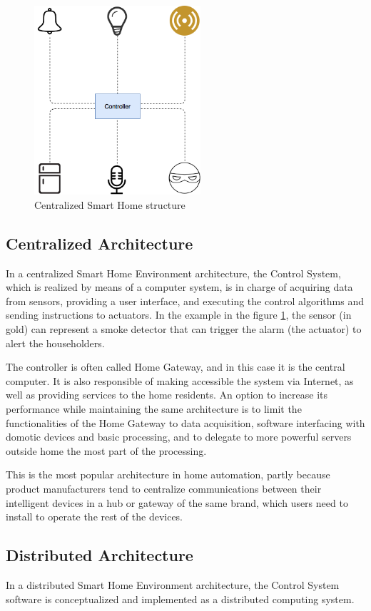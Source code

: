 \begin{figure}
	\centering
	\includegraphics[width=0.55\textwidth]{images/Chapter_02/basic-sh-structure.png}
	\caption{Centralized Smart Home structure}
	\label{fig:sh-basic-structure}
\end{figure}

\subsection{Centralized Architecture}
In a centralized Smart Home Environment architecture, the Control System, which is realized by means of a computer
system, is in charge of acquiring data from sensors, providing a user interface, and executing the control algorithms and 
sending instructions to actuators.\cite{badica13} In the example in the figure \ref{fig:sh-basic-structure}, the sensor (in gold) 
can represent a smoke detector that can trigger the alarm (the actuator) to alert the householders.

\bigskip
The controller is often called Home Gateway, and in this case it is the central computer. It is also responsible of making 
accessible the system via Internet, as well as providing services to the home residents. An option to increase its performance 
while maintaining the same architecture is to limit the functionalities of the Home Gateway to data acquisition, software 
interfacing with domotic devices and basic processing, and to delegate to more powerful servers outside home the most
part of the processing.

\bigskip
This is the most popular architecture in home automation, partly because product manufacturers tend to centralize communications
between their intelligent devices in a hub or gateway of the same brand, which users need to install to operate the rest of the devices.

\subsection{Distributed Architecture}
In a distributed Smart Home Environment architecture, the Control System software is conceptualized and implemented as a distributed 
computing system.



